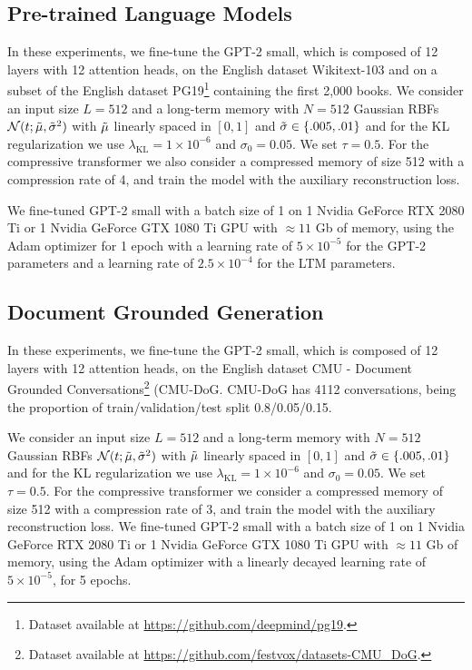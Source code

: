 \documentclass[11pt]{article}
\begin{document}
\subsection{Pre-trained Language Models}
\label{app:gpt2}
In these experiments, we fine-tune the GPT-2 small, which is composed of 12 layers with 12 attention heads, on the English dataset Wikitext-103 and on a subset of the English dataset PG19\footnote{Dataset available at \href{https://github.com/deepmind/pg19}{https://github.com/deepmind/pg19}.} containing the first 2,000 books. We consider an input size  $L=512$ and a long-term memory with $N=512$ Gaussian RBFs $\mathcal{N} (t;\Tilde{\mu},\Tilde{\sigma}^2)$ with $\Tilde{\mu}$ linearly spaced in $[0,1]$ and $\Tilde{\sigma} \in \{.005,.01\}$ and for the KL regularization we use $\lambda_{\mathrm{KL}} = 1 \times 10^{-6}$ and $\sigma_0 = 0.05$. We set $\tau=0.5$. For the compressive transformer we also consider a compressed memory of size 512 with a compression rate of 4, and  train the model with the auxiliary reconstruction loss.

We fine-tuned GPT-2 small with a batch size of 1 on 1 Nvidia GeForce RTX 2080 Ti or 1 Nvidia GeForce GTX 1080 Ti GPU with $\approx 11$ Gb of memory, using the Adam optimizer \citep{kingma2015adam} for 1 epoch with a learning rate of $5\times 10^{-5}$ for the GPT-2 parameters and a learning rate of $2.5\times 10^{-4}$ for the LTM parameters.


\subsection{Document Grounded Generation}
\label{app:dgd}
In these experiments, we fine-tune the GPT-2 small, which is composed of 12 layers with 12 attention heads, on the English dataset CMU - Document Grounded Conversations\footnote{Dataset available at \href{https://github.com/festvox/datasets-CMU_DoG}{https://github.com/festvox/datasets-CMU\_DoG}.} (CMU-DoG. CMU-DoG has 4112 conversations, being the proportion of train/validation/test split 0.8/0.05/0.15.

We consider an input size $L=512$ and a long-term memory with $N=512$ Gaussian RBFs $\mathcal{N} (t;\Tilde{\mu},\Tilde{\sigma}^2)$ with $\Tilde{\mu}$ linearly spaced in $[0,1]$ and $\Tilde{\sigma} \in \{.005,.01\}$ and for the KL regularization we use $\lambda_{\mathrm{KL}} = 1 \times 10^{-6}$ and $\sigma_0 = 0.05$. We set $\tau=0.5$. For the compressive transformer we consider a compressed memory of size 512 with a compression rate of 3, and  train the model with the auxiliary reconstruction loss.
We fine-tuned GPT-2 small with a batch size of 1 on 1 Nvidia GeForce RTX 2080 Ti or 1 Nvidia GeForce GTX 1080 Ti GPU with $\approx 11$ Gb of memory, using the Adam optimizer \citep{kingma2015adam} with a linearly decayed learning rate of $5\times 10^{-5}$, for 5 epochs.
\end{document}
